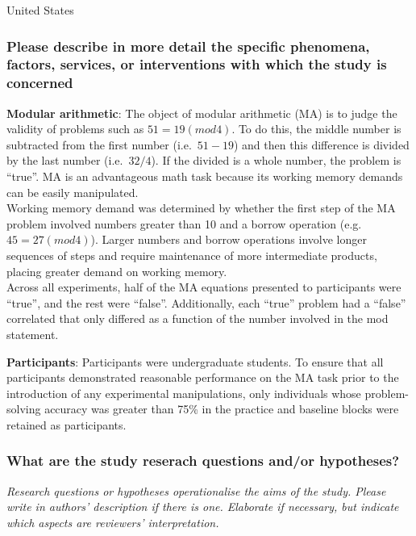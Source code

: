 \documentclass[
  doc, a4paper]{apa7}
\begin{document}
United States

\subsubsection{Please describe in more detail the specific phenomena, factors, services, or interventions with which the study is concerned}\label{please-describe-in-more-detail-the-specific-phenomena-factors-services-or-interventions-with-which-the-study-is-concerned}

\textbf{Modular arithmetic}: The object of modular arithmetic (MA) is to judge the validity of problems such as \(51 = 19 (mod 4)\). To do this, the middle number is subtracted from the first number (i.e.~\(51 - 19\)) and then this difference is divided by the last number (i.e.~\(32 / 4\)). If the divided is a whole number, the problem is ``true''. MA is an advantageous math task because its working memory demands can be easily manipulated.\\
Working memory demand was determined by whether the first step of the MA problem involved numbers greater than 10 and a borrow operation (e.g.~\(45 = 27 (mod 4)\)). Larger numbers and borrow operations involve longer sequences of steps and require maintenance of more intermediate products, placing greater demand on working memory.\\
Across all experiments, half of the MA equations presented to participants were ``true'', and the rest were ``false''. Additionally, each ``true'' problem had a ``false'' correlated that only differed as a function of the number involved in the mod statement.

\textbf{Participants}: Participants were undergraduate students. To ensure that all participants demonstrated reasonable performance on the MA task prior to the introduction of any experimental manipulations, only individuals whose problem-solving accuracy was greater than 75\% in the practice and baseline blocks were retained as participants.

\subsubsection{What are the study reserach questions and/or hypotheses?}\label{what-are-the-study-reserach-questions-andor-hypotheses}

\emph{Research questions or hypotheses operationalise the aims of the study. Please write in authors' description if there is one. Elaborate if necessary, but indicate which aspects are reviewers' interpretation.}
\end{document}

